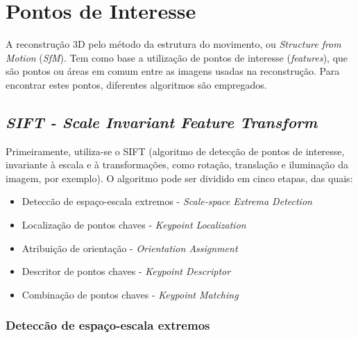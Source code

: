 \chapter{Pontos de Interesse}\label{sec:pontosdeinteresse}
%
A reconstrução 3D pelo método da estrutura do movimento, ou {\it Structure from Motion} ({\it SfM}). Tem como base a utilização de pontos de interesse
({\it features}), que são pontos ou áreas em comum entre as imagens usadas na reconstrução. Para encontrar estes pontos, diferentes algoritmos são empregados.

\section {{\it SIFT - Scale Invariant Feature Transform}}

Primeiramente, utiliza-se o SIFT (algoritmo de detecção de pontos de interesse, invariante à escala e à transformações, como rotação, translação e iluminação da imagem, por exemplo).
O algoritmo pode ser dividido em cinco etapas, das quais:

\begin{itemize}
	\item{Deteccão de espaço-escala extremos - {\it Scale-space Extrema Detection}}
	\item{Localização de pontos chaves - {\it Keypoint Localization}}
	\item{Atribuição de orientação - {\it Orientation Assignment}}
	\item{Descritor de pontos chaves - {\it Keypoint Descriptor}}
	\item{Combinação de pontos chaves - {\it Keypoint Matching}}
\end{itemize}


\subsection{Deteccão de espaço-escala extremos}


